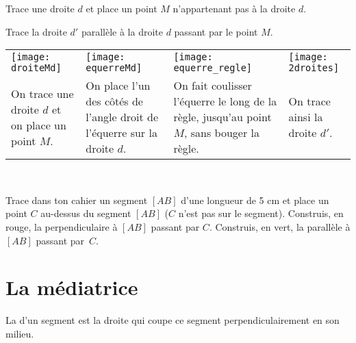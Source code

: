 \newpage


\begin{methode*1}

\begin{exemple*1}
Trace une droite $d$ et place un point $M$ n'appartenant pas à la droite $d$.

Trace la droite $d'$ parallèle à la droite $d$ passant par le point $M$. \\[0.75em]

\begin{tabularx}{\textwidth}{X|X|X|X}
 \texttt{[image: droiteMd]} &  \texttt{[image: equerreMd]} & \texttt{[image: equerre\_regle]} &  \texttt{[image: 2droites]}\\ 
On trace une droite $d$ et on place un point $M$. & On place l'un des côtés de l'angle droit de l'équerre sur la droite $d$. & On fait coulisser l'équerre le long de la règle, jusqu'au point $M$, sans bouger la règle. & On trace ainsi la droite $d'$.\\
\end{tabularx} \\
 
 \end{exemple*1}

\exercice 
Trace dans ton cahier un segment $[AB]$ d'une longueur de 5 cm et place un point $C$ au-dessus du segment $[AB]$ ($C$ n'est pas sur le segment). Construis, en rouge, la perpendiculaire à $[AB]$ passant par $C$. Construis, en vert, la parallèle à $[AB]$ passant par $C$.

\end{methode*1}

\newpage

\section{La médiatrice}

\begin{aconnaitre}
La \textbf{} d'un segment est la droite qui coupe ce segment perpendiculairement en son milieu.
\end{aconnaitre}


